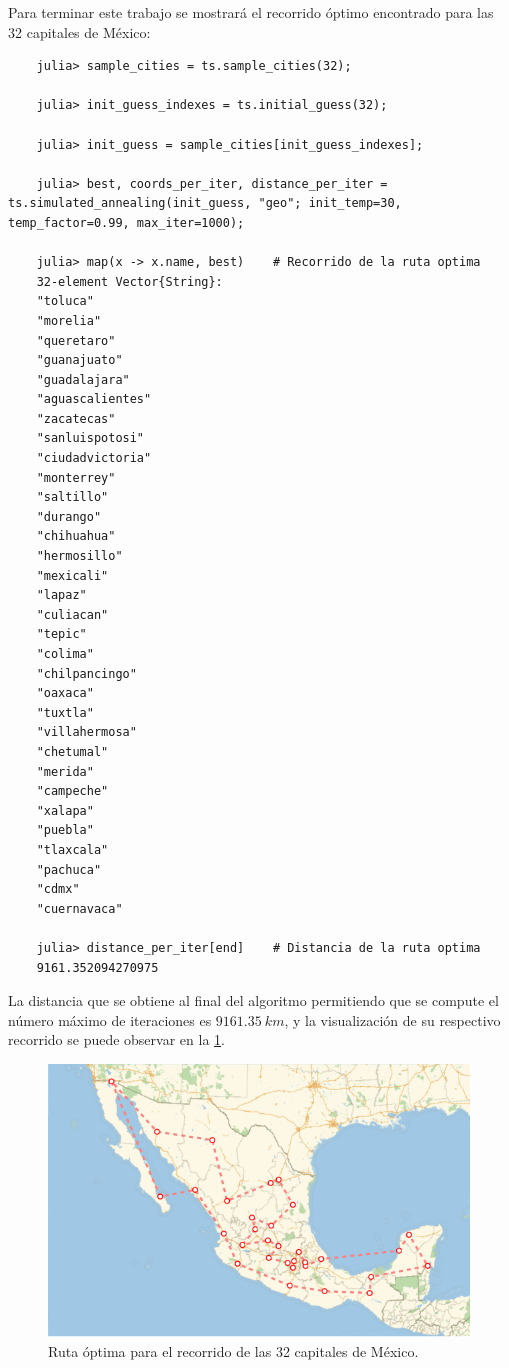 Para terminar este trabajo se mostrará el recorrido óptimo encontrado para las 32 capitales de México:
\begin{verbatim}
    julia> sample_cities = ts.sample_cities(32);

    julia> init_guess_indexes = ts.initial_guess(32);

    julia> init_guess = sample_cities[init_guess_indexes];

    julia> best, coords_per_iter, distance_per_iter = ts.simulated_annealing(init_guess, "geo"; init_temp=30, temp_factor=0.99, max_iter=1000);

    julia> map(x -> x.name, best)    # Recorrido de la ruta optima
    32-element Vector{String}:
    "toluca"
    "morelia"
    "queretaro"
    "guanajuato"
    "guadalajara"
    "aguascalientes"
    "zacatecas"
    "sanluispotosi"
    "ciudadvictoria"
    "monterrey"
    "saltillo"
    "durango"
    "chihuahua"
    "hermosillo"
    "mexicali"
    "lapaz"
    "culiacan"
    "tepic"
    "colima"
    "chilpancingo"
    "oaxaca"
    "tuxtla"
    "villahermosa"
    "chetumal"
    "merida"
    "campeche"
    "xalapa"
    "puebla"
    "tlaxcala"
    "pachuca"
    "cdmx"
    "cuernavaca"

    julia> distance_per_iter[end]    # Distancia de la ruta optima
    9161.352094270975
\end{verbatim}

La distancia que se obtiene al final del algoritmo permitiendo que se compute el número máximo de iteraciones es $9161.35\ km$, y la visualización de su respectivo recorrido se puede observar en la \cref{fig:trip_cities_32_sa}.
\begin{figure}[ht!]
    \centering
    \includegraphics[scale=1.5]{../figures/trip_cities_32_sa.pdf}
    \caption{Ruta óptima para el recorrido de las 32 capitales de México.}
    \label{fig:trip_cities_32_sa}
\end{figure}

